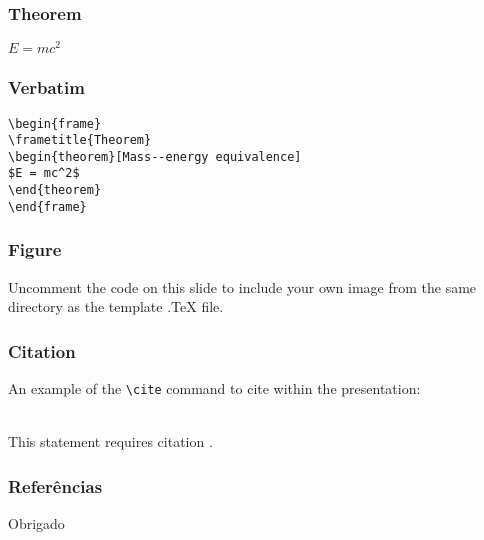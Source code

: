 \documentclass{beamer}
\begin{document}
\begin{frame}
\frametitle{Theorem}
\begin{theorem}
$E = mc^2$
\end{theorem}
\end{frame}


\begin{frame}[fragile] %
\frametitle{Verbatim}
\begin{example}
\begin{verbatim}
\begin{frame}
\frametitle{Theorem}
\begin{theorem}[Mass--energy equivalence]
$E = mc^2$
\end{theorem}
\end{frame}\end{verbatim}
\end{example}
\end{frame}


\begin{frame}
\frametitle{Figure}
Uncomment the code on this slide to include your own image from the same directory as the template .TeX file.
\end{frame}


\begin{frame}[fragile] %
\frametitle{Citation}
An example of the \verb|\cite| command to cite within the presentation:\\~

This statement requires citation \cite{p1}.
\end{frame}


\begin{frame}
\frametitle{Referências}
\footnotesize{
\printbibliography
}
\end{frame}


\begin{frame}
\Huge{\centerline{Obrigado}}
\end{frame}
\end{document}
